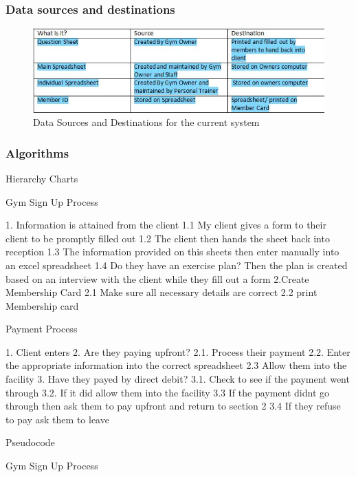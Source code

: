 \subsubsection{Data sources and destinations}

\begin{figure}[H]
    \includegraphics[width=\textwidth]{InvestigationTable1.jpg}
    \caption{Data Sources and Destinations for the current system} \label{fig:Current Destinations}
\end{figure}

\subsubsection{Algorithms}

Hierarchy Charts

Gym Sign Up Process
\begin{python}
1. Information is attained from the client
	1.1 My client gives a form to their client to be promptly filled out
	1.2 The client then hands the sheet back into reception 
	1.3 The information provided on this sheets then enter manually into an excel spreadsheet
	1.4 Do they have an exercise plan? Then the plan is created based on an interview  with the client while they fill out a form
2.Create Membership Card
	2.1 Make sure all necessary details are correct
	2.2 print Membership card 
\end{python}

Payment Process
\begin{python}
1. Client enters
2. Are they paying upfront?
2.1. Process their payment
2.2. Enter the appropriate information into the correct spreadsheet
2.3 Allow them into the facility
3. Have they payed by direct debit?
3.1. Check to see if the payment went through
3.2. If it did allow them into the facility
3.3 If the payment didnt go through then ask them to pay upfront and return to section 2
3.4 If they refuse to pay ask them to leave
\end{python}

Pseudocode


Gym Sign Up Process

